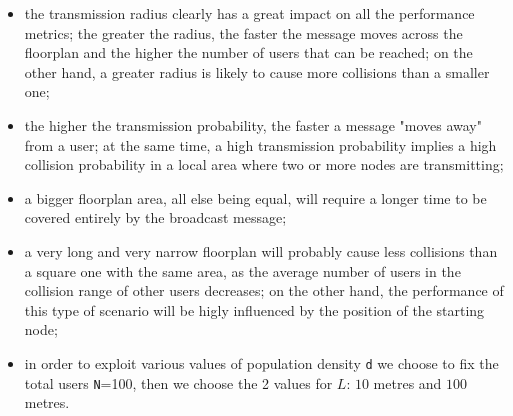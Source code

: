 \begin{itemize}
    \item the transmission radius clearly has a great impact on all the
    performance metrics; the greater the radius, the faster the message moves
    across the floorplan and the higher the number of users that can be reached;
    on the other hand, a greater radius is likely to cause more collisions than
    a smaller one;
    \item the higher the transmission probability, the faster a message "moves
    away" from a user; at the same time, a high transmission probability implies
    a high collision probability in a local area where two or more nodes are
    transmitting;
    \item a bigger floorplan area, all else being equal, will require a longer
    time to be covered entirely by the broadcast message;
    \item a very long and very narrow floorplan will probably cause less
    collisions than a square one with the same area, as the average number of
    users in the collision range of other users decreases; on the other hand, the 
	performance of this type of scenario will be higly influenced by the position of the 
	starting node;
    \item in order to exploit various values of  population density \texttt{d}
	we choose to fix the total users \texttt{N}=100, then we choose the 2 values for $L$: 
	$10$ metres and $100$ metres.
\end{itemize}


